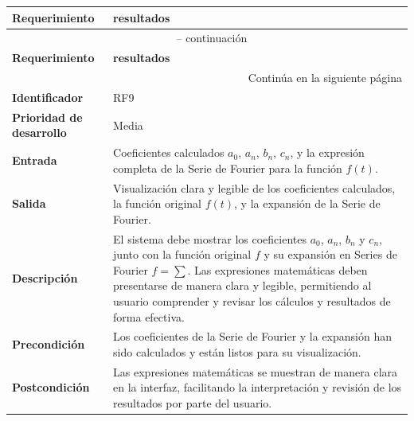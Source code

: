 \begin{longtable}{|m{3.5cm}|m{9.5cm}|}
	\hline
	\rowcolor{black!75} \color{white}\textbf{Requerimiento} & \color{white}\textbf{resultados} \\
	\hline
	\endfirsthead
	\multicolumn{2}{c}{{\tablename\ \thetable{} -- continuación}} \\
	\hline
	\rowcolor{black!75} \color{white}\textbf{Requerimiento} & \color{white}\textbf{resultados} \\
	\hline
	\endhead
	\hline \multicolumn{2}{r}{{Continúa en la siguiente página}} \\
	\endfoot
	\hline
	\endlastfoot
	
	\textbf{Identificador} & RF9 \\
	\hline
	\textbf{Prioridad de desarrollo} & Media \\
	\hline
	\textbf{Entrada} & Coeficientes calculados \( a_0 \), \( a_n \), \( b_n \), \( c_n \), y la expresión completa de la Serie de Fourier para la función \( f(t) \). \\
	\hline
	\textbf{Salida} & Visualización clara y legible de los coeficientes calculados, la función original \( f(t) \), y la expansión de la Serie de Fourier. \\
	\hline
	\textbf{Descripción} & El sistema debe mostrar los coeficientes \( a_0 \), \( a_n \), \( b_n \) y \( c_n \), junto con la función original \( f \) y su expansión en Series de Fourier $f = \sum$. Las expresiones matemáticas deben presentarse de manera clara y legible, permitiendo al usuario comprender y revisar los cálculos y resultados de forma efectiva. \\
	\hline
	\textbf{Precondición} & Los coeficientes de la Serie de Fourier y la expansión han sido calculados y están listos para su visualización. \\
	\hline
	\textbf{Postcondición} & Las expresiones matemáticas se muestran de manera clara en la interfaz, facilitando la interpretación y revisión de los resultados por parte del usuario. \\
	\hline
\end{longtable}
\caption{Requerimiento funcional No. 9} \label{tabla:RF9}
\vspace{0.5cm}

